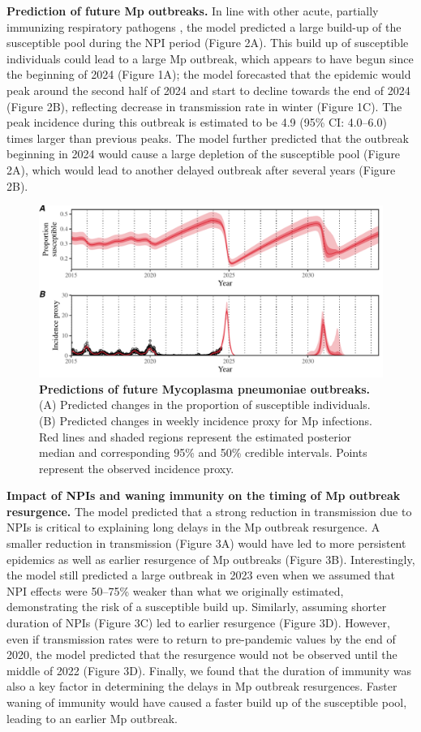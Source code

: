 \documentclass[12pt]{article}
\begin{document}
\textbf{Prediction of future Mp outbreaks.}
In line with other acute, partially immunizing respiratory pathogens \citep{baker2020impact}, the model predicted a large build-up of the susceptible pool during the NPI period (Figure 2A).
This build up of susceptible individuals could lead to a large Mp outbreak, which appears to have begun since the beginning of 2024 (Figure 1A);
the model forecasted that the epidemic would peak around the second half of 2024 and start to decline towards the end of 2024 (Figure 2B), reflecting decrease in transmission rate in winter (Figure 1C).
The peak incidence during this outbreak is estimated to be 4.9 (95\% CI: 4.0--6.0) times larger than previous peaks.
The model further predicted that the outbreak beginning in 2024 would cause a large depletion of the susceptible pool (Figure 2A), which would lead to another delayed outbreak after several years (Figure 2B).

\begin{figure}[!th]
\includegraphics[width=\textwidth]{../figure2/figure2_new.pdf}
\caption{
\textbf{Predictions of future Mycoplasma pneumoniae outbreaks.}
(A) Predicted changes in the proportion of susceptible individuals.
(B) Predicted changes in weekly incidence proxy for Mp infections.
Red lines and shaded regions represent the estimated posterior median and corresponding 95\% and 50\% credible intervals.
Points represent the observed incidence proxy.
}
\end{figure}

\textbf{Impact of NPIs and waning immunity on the timing of Mp outbreak resurgence.}
The model predicted that a strong reduction in transmission due to NPIs is critical to explaining long delays in the Mp outbreak resurgence.
A smaller reduction in transmission (Figure 3A) would have led to more persistent epidemics as well as earlier resurgence of Mp outbreaks (Figure 3B).
Interestingly, the model still predicted a large outbreak in 2023 even when we assumed that NPI effects were 50--75\% weaker than what we originally estimated, demonstrating the risk of a susceptible build up.
Similarly, assuming shorter duration of NPIs (Figure 3C) led to earlier resurgence (Figure 3D).
However, even if transmission rates were to return to pre-pandemic values by the end of 2020, the model predicted that the resurgence would not be observed until the middle of 2022 (Figure 3D).
Finally, we found that the duration of immunity was also a key factor in determining the delays in Mp outbreak resurgences.
Faster waning of immunity would have caused a faster build up of the susceptible pool, leading to an earlier Mp outbreak.
\end{document}
